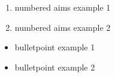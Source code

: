 \begin{enumerate}
\item numbered aims example 1
\item numbered aims example 2
\end{enumerate}

\begin{itemize}
\item bulletpoint example 1
\item bulletpoint example 2
\end{itemize}
